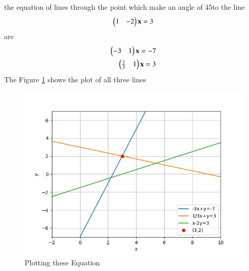 the equation of lines through the point   which make an angle of 45\degree to the line
\begin{align}
\begin{pmatrix}1 & -2\end{pmatrix}\mathbf{x} = 3 
\end{align}
are
\begin{align}
   \begin{pmatrix}-3 & 1\end{pmatrix}\mathbf{x}=-7\\ 
   \begin{pmatrix}\frac{1}{3} & 1\end{pmatrix}\mathbf{x}=3
\end{align}
The Figure \ref{fig:solution_line_pane_49}
shows the plot of all three lines
\begin{figure}[!ht]
\centering
\includegraphics[width=\columnwidth]{./solutions/line_plane/49/Edit_plot.png}
\caption{Plotting these Equation}
\label{fig:solution_line_pane_49}
\end{figure}
